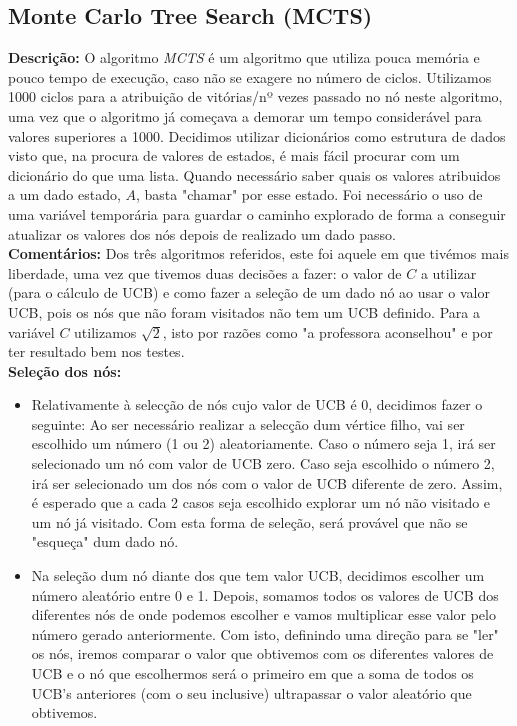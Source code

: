 \documentclass{article}
\begin{document}
\subsection{Monte Carlo Tree Search (MCTS)}
\textbf{Descrição: }O algoritmo \textit{MCTS} é um algoritmo que utiliza pouca memória e pouco tempo de execução, caso não se exagere no número de ciclos. Utilizamos 1000 ciclos para a atribuição de vitórias/nº vezes passado no nó neste algoritmo, uma vez que o algoritmo já começava a demorar um tempo considerável para valores superiores a 1000. Decidimos utilizar dicionários como estrutura de dados visto que, na procura de valores de estados, é mais fácil procurar com um dicionário do que uma lista. Quando necessário saber quais os valores atribuidos a um dado estado, $A$, basta "chamar" por esse estado. Foi necessário o uso de uma variável temporária para guardar o caminho explorado de forma a conseguir atualizar os valores dos nós depois de realizado um dado passo.\\[4mm]
\textbf{Comentários: }Dos três algoritmos referidos, este foi aquele em que tivémos mais liberdade, uma vez que tivemos duas decisões a fazer: o valor de $C$ a utilizar (para o cálculo de UCB) e como fazer a seleção de um dado nó ao usar o valor UCB, pois os nós que não foram visitados não tem um UCB definido. Para a variável $C$ utilizamos $\sqrt{2}$, isto por razões como "a professora aconselhou" e por ter resultado bem nos testes. \\[4mm]
\textbf{Seleção dos nós: }
\begin{itemize}
\item[\textbullet]{Relativamente à selecção de nós cujo valor de UCB é 0, decidimos fazer o seguinte: Ao ser necessário realizar a selecção dum vértice filho, vai ser escolhido um número (1 ou 2) aleatoriamente. Caso o número seja 1, irá ser selecionado um nó com valor de UCB zero. Caso seja escolhido o número 2, irá ser selecionado um dos nós com o valor de UCB diferente de zero. Assim, é esperado que a cada 2 casos seja escolhido explorar um nó não visitado e um nó já visitado. Com esta forma de seleção, será provável que não se "esqueça" dum dado nó.}
\item[\textbullet]{Na seleção dum nó diante dos que tem valor UCB, decidimos escolher um número aleatório entre 0 e 1. Depois, somamos todos os valores de UCB dos diferentes nós de onde podemos escolher e vamos multiplicar esse valor pelo número gerado anteriormente. Com isto, definindo uma direção para se "ler" os nós, iremos comparar o valor que obtivemos com os diferentes valores de UCB e o nó que escolhermos será o primeiro em que a soma de todos os UCB's anteriores (com o seu inclusive) ultrapassar o valor aleatório que obtivemos.}
\end{itemize}
\end{document}
